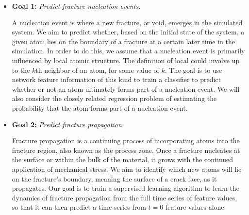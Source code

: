 \begin{itemize}
\item \textbf{Goal 1:} \emph{Predict fracture nucleation events.} 

A nucleation event is where a new fracture, or void, emerges in the simulated system.  We aim to predict whether, based on the initial state of the system, a given atom lies on the boundary of a fracture at a certain later time in the simulation.  In order to do this, we assume that a nucleation event is primarily influenced by local atomic structure.  The definition of local could involve up to the $k$th neighbor of an atom, for some value of $k$.  The goal is to use network feature information of this kind to train a classifier to predict whether or not an atom ultimately forms part of a nucleation event.  We will also consider the closely related regression problem of estimating the probability that the atom forms part of a nucleation event.

\item \textbf{Goal 2:} \emph{Predict fracture propagation.} 

Fracture propagation is a continuing process of incorporating atoms into the fracture region, also known as the process zone.
Once a fracture nucleates at the surface or within the bulk of the material, it grows with the continued application of mechanical stress.  We aim to identify which new atoms will lie on the fracture's boundary, meaning the surface of a crack face, as it propagates.  Our goal is to train a supervised learning algorithm to learn the dynamics of fracture propagation from the full time series of feature values, so that it can then predict a time series from $t=0$ feature values alone.
\end{itemize}




